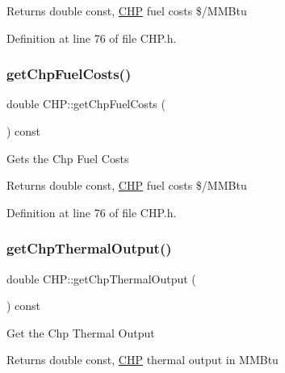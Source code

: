 \begin{DoxyReturn}{Returns}
double const, \hyperlink{class_c_h_p}{C\+HP} fuel costs \$/\+M\+M\+Btu 
\end{DoxyReturn}


Definition at line 76 of file C\+H\+P.\+h.

\mbox{\label{class_c_h_p_a00929ba5d10367258dc1dc437eda88e3}} 
\subsubsection{\texorpdfstring{get\+Chp\+Fuel\+Costs()}{getChpFuelCosts()}\hspace{0.1cm}{\footnotesize\ttfamily [3/3]}}
{\footnotesize\ttfamily double C\+H\+P\+::get\+Chp\+Fuel\+Costs (\begin{DoxyParamCaption}{ }\end{DoxyParamCaption}) const\hspace{0.3cm}{\ttfamily [inline]}}

Gets the Chp Fuel Costs

\begin{DoxyReturn}{Returns}
double const, \hyperlink{class_c_h_p}{C\+HP} fuel costs \$/\+M\+M\+Btu 
\end{DoxyReturn}


Definition at line 76 of file C\+H\+P.\+h.

\mbox{\label{class_c_h_p_a13e271f59d6315088416123c6e794e09}} 
\subsubsection{\texorpdfstring{get\+Chp\+Thermal\+Output()}{getChpThermalOutput()}\hspace{0.1cm}{\footnotesize\ttfamily [1/3]}}
{\footnotesize\ttfamily double C\+H\+P\+::get\+Chp\+Thermal\+Output (\begin{DoxyParamCaption}{ }\end{DoxyParamCaption}) const\hspace{0.3cm}{\ttfamily [inline]}}

Get the Chp Thermal Output

\begin{DoxyReturn}{Returns}
double const, \hyperlink{class_c_h_p}{C\+HP} thermal output in M\+M\+Btu 
\end{DoxyReturn}


